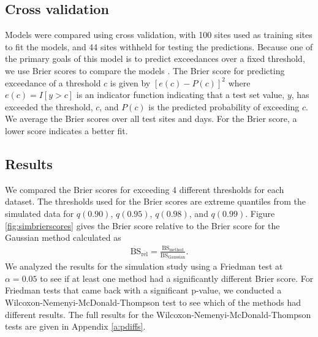 \documentclass[11pt]{article}
\begin{document}
\subsection{Cross validation}\label{s:modelselect}
Models were compared using cross validation, with 100 sites used as training sites to fit the models, and 44 sites withheld for testing the predictions.
Because one of the primary goals of this model is to predict exceedances over a fixed threshold, we use Brier scores to compare the models \citep{Gneiting2007}.
The Brier score for predicting exceedance of a threshold $c$ is given by $[e(c) - P(c)]^2$ where $e(c) = I[y>c]$ is an indicator function indicating that a test set value, $y$, has exceeded the threshold, $c$, and $P(c)$ is the predicted probability of exceeding $c$.
We average the Brier scores over all test sites and days.
For the Brier score, a lower score indicates a better fit.

\subsection{Results}\label{s:simresults}
We compared the Brier scores for exceeding 4 different thresholds for each dataset.
The thresholds used for the Brier scores are extreme quantiles from the simulated data for $q(0.90)$, $q(0.95)$, $q(0.98)$, and $q(0.99)$.
Figure \ref{fig:simbrierscores} gives the Brier score relative to the Brier score for the Gaussian method calculated as
\begin{align}
  \text{BS}_{\text{rel}} = \frac{\text{BS}_{\text{method}}}{\text{BS}_{\text{Gaussian}}}.
\end{align}
We analyzed the results for the simulation study using a Friedman test at $\alpha = 0.05$ to see if at least one method had a significantly different Brier score.
For Friedman tests that came back with a significant p-value, we conducted a Wilcoxon-Nemenyi-McDonald-Thompson test to see which of the methods had different results.
The full results for the Wilcoxon-Nemenyi-McDonald-Thompson tests are given in Appendix \ref{a:pdiffs}.
\end{document}
